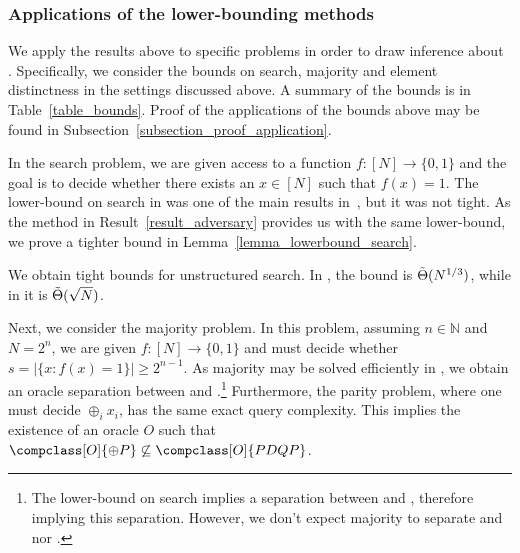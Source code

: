 \subsubsection{Applications of the lower-bounding methods}

\begin{table}[t!]
    \centering

    \caption{Summary of bounds on all the computational models explored. The non-trivial bounds we establish or improve in this paper are colored \textcolor{darkred}{red}. The $\mathsf{BQP}$ bounds are added for reference.}
    \label{table_bounds}
\end{table}

We apply the results above to specific problems in order to draw inference about \pdqpname. Specifically, we consider the bounds on search, majority and element distinctness in the settings discussed above. A summary of the bounds is in Table~\ref{table_bounds}. Proof of the applications of the bounds above may be found in Subsection~\ref{subsection_proof_application}.

In the search problem, we are given access to a function $f:[N]\rightarrow \{0,1\}$ and the goal is to decide whether there exists an $x\in [N]$ such that $f(x)=1$. The lower-bound on search in \pdqpname was one of the main results in~\cite{space_above_bqp}, but it was not tight. As the method in Result~\ref{result_adversary} provides us with the same lower-bound, we prove a tighter bound in Lemma~\ref{lemma_lowerbound_search}.

\begin{result}
    We obtain tight bounds for unstructured search. In \pdqpname, the bound is $\Tilde{\Theta}(N^{1/3})$, while in \pdqpnaqname it is $\Tilde{\Theta}(\sqrt{N})$.
\end{result}

Next, we consider the majority problem. In this problem, assuming $n\in \mathbb{N}$ and $N=2^n$, we are given $f:[N]\rightarrow \{0,1\}$ and must decide whether $s=|\{x: f(x)=1\}| \geq 2^{n-1}$. As majority may be solved efficiently in , we obtain an oracle separation between  and \pdqpname.\footnote{The lower-bound on search implies a separation between  and \pdqpname, therefore implying this separation. However, we don't expect majority to separate \pdqpname and  nor .} Furthermore, the parity problem, where one must decide $\oplus_i x_i$, has the same exact query complexity. This implies the existence of an oracle $O$ such that $\compclass[O]{\oplus P}\not\subseteq \compclass[O]{PDQP}$.

